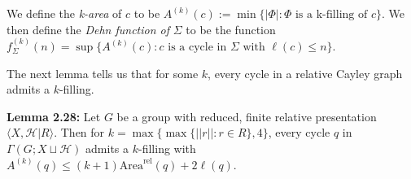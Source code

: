 \documentclass[12pt]{article}
\newcommand{\vs}{\vskip10pt}
\begin{document}
	\vs 
	
	We define the \textit{k-area} of $c$ to be $A^{(k)}(c) := \min \{ \vert \Phi \vert : \Phi \text{ is a k-filling of } c\}$. We then define the \textit{Dehn function of } $\Sigma$ to be the function $f^{(k)}_ {\Sigma} (n) = \sup \{A^{(k)}(c) : c \text{ is a cycle in } \Sigma \text{ with }\ell(c) \leq n\}$. 
	
	\vs 
	
	The next lemma tells us that for some $k$, every cycle in a relative Cayley graph admits a $k$-filling. 
	
	\vs 
	
	\textbf{Lemma 2.28: } Let $G$ be a group with reduced, finite relative presentation $\langle X, \mathcal{H} \vert R \rangle$. Then for $k = \max \{\max \{\vert \vert r \vert \vert : r \in R\}, 4\}$, every cycle $q$ in $\Gamma(G; X \sqcup \mathcal{H})$ admits a $k$-filling with $A^{(k)}(q) \leq (k+1) \text{Area}^{\text{rel}}(q) + 2 \ell (q)$. 
	
\end{document}
